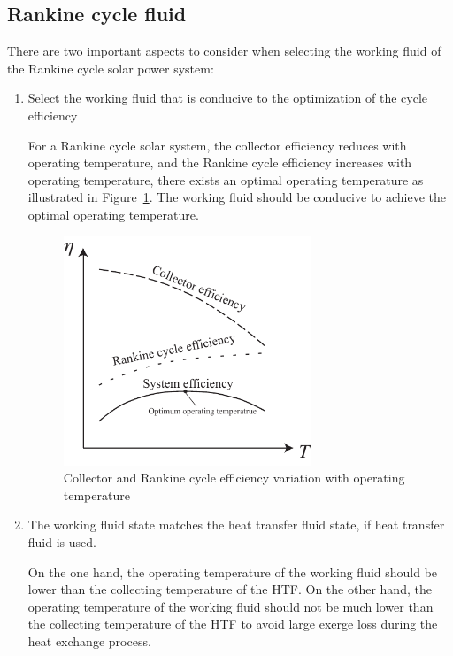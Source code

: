 \subsection{Rankine cycle fluid}

There are two important aspects to consider when selecting the working fluid of the Rankine cycle solar power system:
\begin{enumerate}
  \item Select the working fluid that is conducive to the optimization of the cycle efficiency
  
  For a Rankine cycle solar system, the collector efficiency reduces with operating temperature, and the Rankine cycle efficiency increases with operating temperature, there exists an optimal operating temperature as illustrated in Figure~\ref{fig:Efficiency}. The working fluid should be conducive to achieve the optimal operating temperature.
  
  \begin{figure}[!ht]
\centering 
\includegraphics[width=0.7\textwidth]{fig/Efficiency}
\caption{Collector and Rankine cycle efficiency variation with operating temperature}\label{fig:Efficiency}
\end{figure}
  
  \item The working fluid state matches the heat transfer fluid state, if heat transfer fluid is used.
  
  On the one hand, the operating temperature of the working fluid should be lower than the collecting temperature of the HTF. On the other hand, the operating temperature of the working fluid should not be much lower than the collecting temperature of the HTF to avoid large exerge loss during the heat exchange process.
  
\end{enumerate}

